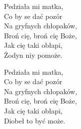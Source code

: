 \begin{text}
Pedziała mi matka,\\
Co by se dać pozór\\
Na gryfnych chłopaków,\\
Broń cię, broń cię Boże,\\
Jak cię taki obłapi, \\
Żodyn niy pomoże.

Pedziała mi matka,\\
Co by se dać pozór\\
Na gryfnych chłopaków,\\
Broń cię, broń cię Boże,\\
Jak cię taki obłapi, \\
Diobeł to być może.
\end{text}
\begin{chord}
\end{chord}